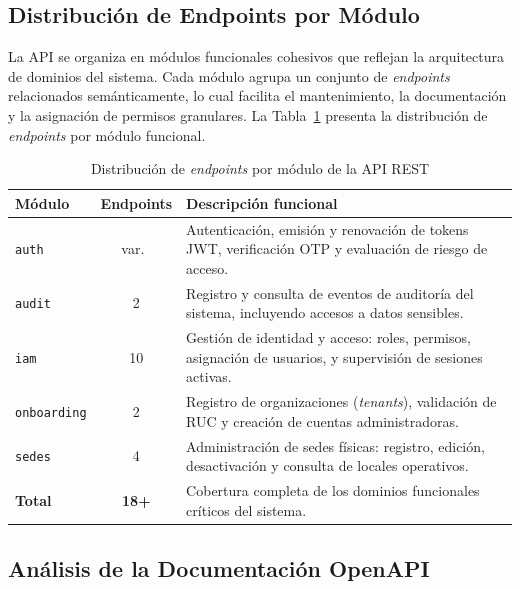 \subsection{Distribuci\'on de Endpoints por M\'odulo}
\label{subsec:endpoints-modulo}

La API se organiza en m\'odulos funcionales cohesivos que reflejan la
arquitectura de dominios del sistema. Cada m\'odulo agrupa un conjunto de
\textit{endpoints} relacionados sem\'anticamente, lo cual facilita el
mantenimiento, la documentaci\'on y la asignaci\'on de permisos granulares.
La Tabla~\ref{tab:endpoints-modulo} presenta la distribuci\'on de
\textit{endpoints} por m\'odulo funcional.

\begin{table}[htbp]
\centering
\caption{Distribuci\'on de \textit{endpoints} por m\'odulo de la API REST}
\label{tab:endpoints-modulo}
\begin{tabular}{|l|c|p{7cm}|}
\hline
\textbf{M\'odulo} & \textbf{Endpoints} & \textbf{Descripci\'on funcional} \\
\hline
\texttt{auth}       & var.\ & Autenticaci\'on, emisi\'on y renovaci\'on de tokens JWT, verificaci\'on OTP y evaluaci\'on de riesgo de acceso. \\
\hline
\texttt{audit}      & 2  & Registro y consulta de eventos de auditor\'ia del sistema, incluyendo accesos a datos sensibles. \\
\hline
\texttt{iam}        & 10 & Gesti\'on de identidad y acceso: roles, permisos, asignaci\'on de usuarios, y supervisi\'on de sesiones activas. \\
\hline
\texttt{onboarding} & 2  & Registro de organizaciones (\textit{tenants}), validaci\'on de RUC y creaci\'on de cuentas administradoras. \\
\hline
\texttt{sedes}      & 4  & Administraci\'on de sedes f\'isicas: registro, edici\'on, desactivaci\'on y consulta de locales operativos. \\
\hline
\hline
\textbf{Total}      & \textbf{18+} & Cobertura completa de los dominios funcionales cr\'iticos del sistema. \\
\hline
\end{tabular}
\end{table}

\subsection{An\'alisis de la Documentaci\'on OpenAPI}
\label{subsec:analisis-openapi}

